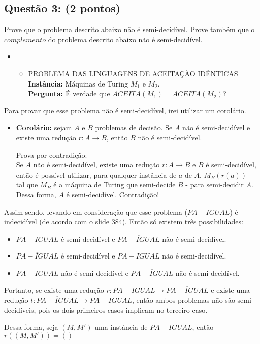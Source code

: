 \documentclass{article}
\begin{document}
\subsection*{Questão 3: (2 pontos)} Prove que o problema descrito abaixo não é semi-decidível. Prove também que o $complemento$ do problema descrito abaixo não é semi-decidível.
\begin{itemize}[label={}]
  \item
    \fbox
    {
      \parbox{\textwidth}
      {
        \begin{itemize}
          \item PROBLEMA DAS LINGUAGENS DE ACEITAÇÃO IDÊNTICAS\\
                \textbf{Instância:} Máquinas de Turing $M_1$ e $M_2$.\\
                \textbf{Pergunta:} É verdade que $ACEITA(M_1) = ACEITA(M_2)$?
        \end{itemize}
      }
    }
\end{itemize}

{
\color{blue}
  Para provar que esse problema não é semi-decidível, irei utilizar um corolário.
  \begin{itemize}
    \item \textbf{Corolário:} sejam $A$ e $B$ problemas de decisão. Se $A$ não é semi-decidível e existe uma redução $r: A \to B$, então $B$ não é semi-decidível.
    \par Prova por contradição: \\
    Se $A$ não é semi-decidível, existe uma redução $r: A \to B$ e $B$ é semi-decidível, então é possível utilizar, para qualquer instância de $a$ de $A$, $M_B(r(a))$ - tal que $M_B$ é a máquina de Turing que semi-decide $B$ - para semi-decidir $A$. Dessa forma, $A$ é semi-decidível. Contradição!
  \end{itemize}
  Assim sendo, levando em consideração que esse problema ($PA-IGUAL$) é indecidível (de acordo com o slide 384). Então só existem três possibilidades:
  \begin{itemize}
    \item $PA-IGUAL$ é semi-decidível e $\overline{PA-IGUAL}$ não é semi-decidível.
    \item $\overline{PA-IGUAL}$ é semi-decidível e ${PA-IGUAL}$ não é semi-decidível.
    \item $PA-IGUAL$ não é semi-decidível e $\overline{PA-IGUAL}$ não é semi-decidível.
  \end{itemize}
  Portanto, se existe uma redução $r:PA-IGUAL \to \overline{PA-IGUAL}$ e existe uma redução $t:\overline{PA-IGUAL} \to PA-IGUAL$, então ambos problemas não são semi-decidíveis, pois os dois primeiros casos implicam no terceiro caso.
  \par Dessa forma, seja $(M,M')$ uma instância de $PA-IGUAL$, então $r((M,M')) = ()$

}
\end{document}
